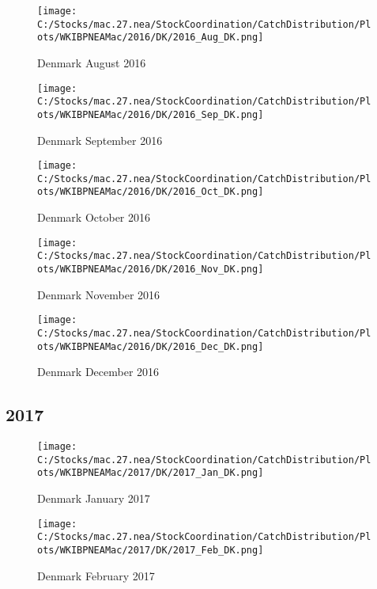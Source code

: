 \documentclass{article}
\begin{document}
\begin{figure}
	\centering
		\texttt{[image: C:/Stocks/mac.27.nea/StockCoordination/CatchDistribution/Plots/WKIBPNEAMac/2016/DK/2016\_Aug\_DK.png]}
	\caption{Denmark August 2016}
	\label{fig:2016_Aug_DK}
\end{figure}

\begin{figure}
	\centering
		\texttt{[image: C:/Stocks/mac.27.nea/StockCoordination/CatchDistribution/Plots/WKIBPNEAMac/2016/DK/2016\_Sep\_DK.png]}
	\caption{Denmark September 2016}
	\label{fig:2016_Sep_DK}
\end{figure}

\begin{figure}
	\centering
		\texttt{[image: C:/Stocks/mac.27.nea/StockCoordination/CatchDistribution/Plots/WKIBPNEAMac/2016/DK/2016\_Oct\_DK.png]}
	\caption{Denmark October 2016}
	\label{fig:2016_Oct_DK}
\end{figure}

\begin{figure}
	\centering
		\texttt{[image: C:/Stocks/mac.27.nea/StockCoordination/CatchDistribution/Plots/WKIBPNEAMac/2016/DK/2016\_Nov\_DK.png]}
	\caption{Denmark November 2016}
	\label{fig:2016_Nov_DK}
\end{figure}

\begin{figure}
	\centering
		\texttt{[image: C:/Stocks/mac.27.nea/StockCoordination/CatchDistribution/Plots/WKIBPNEAMac/2016/DK/2016\_Dec\_DK.png]}
	\caption{Denmark December 2016}
	\label{fig:2016_Dec_DK}
\end{figure}


\clearpage

\newpage

\subsection{2017}



\begin{figure}[h]
	\centering
		\texttt{[image: C:/Stocks/mac.27.nea/StockCoordination/CatchDistribution/Plots/WKIBPNEAMac/2017/DK/2017\_Jan\_DK.png]}
	\caption{Denmark January 2017}
	\label{fig:2017_Jan_DK}
\end{figure}

\begin{figure}
	\centering
		\texttt{[image: C:/Stocks/mac.27.nea/StockCoordination/CatchDistribution/Plots/WKIBPNEAMac/2017/DK/2017\_Feb\_DK.png]}
	\caption{Denmark February 2017}
	\label{fig:2017_Feb_DK}
\end{figure}
\end{document}
